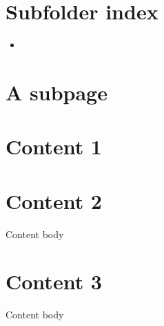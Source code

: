 \chapter{Subfolder index}
\label{\detokenize{subfolder/index:subfolder-index}}\label{\detokenize{subfolder/index::doc}}
\sphinxAtStartPar
{}
\begin{itemize}
\item{} 

\end{itemize}


\chapter{A subpage}
\label{\detokenize{subfolder/asubpage:a-subpage}}\label{\detokenize{subfolder/asubpage::doc}}

\chapter{Content 1}
\label{\detokenize{content1:content-1}}\label{\detokenize{content1::doc}}

\chapter{Content 2}
\label{\detokenize{content2:content-2}}\label{\detokenize{content2::doc}}
\sphinxAtStartPar
Content body


\chapter{Content 3}
\label{\detokenize{content3:content-3}}\label{\detokenize{content3::doc}}
\sphinxAtStartPar
Content body







\renewcommand{\indexname}{Index}
\printindex
